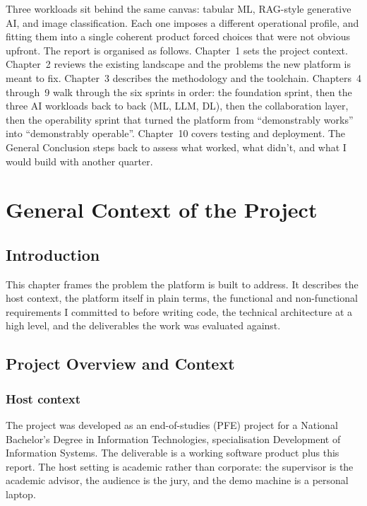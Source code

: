 \documentclass[12pt, a4paper]{report}
\begin{document}
Three workloads sit behind the same canvas: tabular ML, RAG-style
generative AI, and image classification. Each one imposes a different
operational profile, and fitting them into a single coherent product
forced choices that were not obvious upfront. The report is organised
as follows. Chapter~1 sets the project context. Chapter~2 reviews the
existing landscape and the problems the new platform is meant to fix.
Chapter~3 describes the methodology and the toolchain. Chapters~4
through~9 walk through the six sprints in order: the foundation sprint,
then the three AI workloads back to back (ML, LLM, DL), then the
collaboration layer, then the operability sprint that turned the
platform from ``demonstrably works'' into ``demonstrably operable''.
Chapter~10 covers testing and deployment. The General Conclusion steps
back to assess what worked, what didn't, and what I would build with
another quarter.

\newpage

\chapter{General Context of the Project}

\section*{Introduction}

This chapter frames the problem the platform is built to address. It
describes the host context, the platform itself in plain terms, the
functional and non-functional requirements I committed to before
writing code, the technical architecture at a high level, and the
deliverables the work was evaluated against.

\section{Project Overview and Context}

\subsection{Host context}

The project was developed as an end-of-studies (PFE) project for a
National Bachelor's Degree in Information Technologies, specialisation
Development of Information Systems. The deliverable is a working
software product plus this report. The host setting is academic rather
than corporate: the supervisor is the academic advisor, the audience
is the jury, and the demo machine is a personal laptop.
\end{document}
